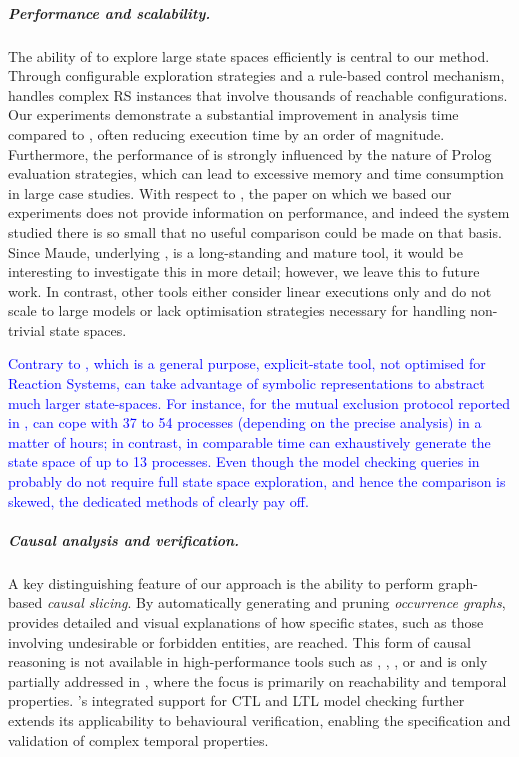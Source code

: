 \subparagraph*{Performance and scalability.}
The ability of \GROOVE to explore large state spaces efficiently is central to our method. Through configurable exploration strategies and a rule-based control mechanism, \GROOVE handles complex RS instances that involve thousands of reachable configurations. Our experiments demonstrate a substantial improvement in analysis time compared to \BioResolve, often reducing execution time by an order of magnitude. Furthermore, the performance of \BioResolve is strongly influenced by the nature of Prolog evaluation strategies, which can lead to excessive memory and time consumption in large case studies. With respect to \ccReact, the paper \cite{DBLP:conf/cmsb/BallisBFO24} on which we based our experiments does not provide information on performance, and indeed the system studied there is so small that no useful comparison could be made on that basis. Since Maude, underlying \ccReact, is a long-standing and mature tool, it would be interesting to investigate this in more detail; however, we leave this to future work.
In contrast, other tools either consider linear executions only and do not scale to large models or lack optimisation strategies necessary for handling non-trivial state spaces.

\textcolor{blue}{%
Contrary to \GROOVE, which is a general purpose, explicit-state tool, not optimised for Reaction Systems, \ReactICS can take advantage of symbolic representations to abstract much larger state-spaces.
For instance, for the mutual exclusion protocol reported in \cite{DBLP:journals/isci/MeskiPR15,DBLP:journals/fuin/NobilePSMCMB17}, \ReactICS can cope with 37 to 54 processes (depending on the precise analysis) in a matter of hours; in contrast, in comparable time \GROOVE can exhaustively generate the state space of up to 13 processes. Even though the model checking queries in \ReactICS probably do not require full state space exploration, and hence the comparison is skewed, the dedicated methods of \ReactICS clearly pay off.
}

\subparagraph*{Causal analysis and verification.}
A key distinguishing feature of our approach is the ability to perform graph-based \emph{causal slicing}. By automatically generating and pruning \emph{occurrence graphs}, \GROOVE provides detailed and visual explanations of how specific states, such as those involving undesirable or forbidden entities, are reached.
This form of causal reasoning is not available in high-performance tools such as \HERESY, \WebRSim, \clrs, or 
\textcolor{blue}{
\ReactICS 
}
and is only partially addressed in \ccReact, where the focus is primarily on reachability and temporal properties. 
\GROOVE's integrated support for CTL and LTL model checking further extends its applicability to behavioural verification, enabling the specification and validation of complex temporal properties. 

